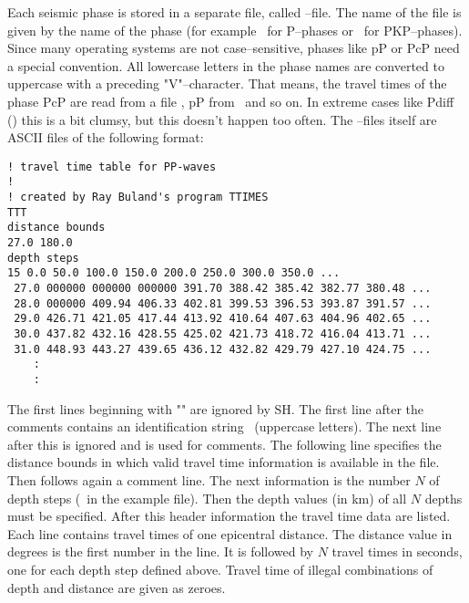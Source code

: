 Each seismic phase is stored in a separate file, called
--file.  The name of the file is given by the name
of the phase (for example \ for P--phases or
\ for PKP--phases).  Since many operating systems are
not case--sensitive, phases like pP or PcP need a special
convention.  All lowercase letters in the phase names are converted
to uppercase with a preceding "V"--character.  That means,
the travel times of the phase PcP are read from a file
, pP from \ and so on.  In extreme
cases like Pdiff () this is a bit clumsy, but
this doesn't happen too often.  The --files itself
are ASCII files of the following format:

\begin{verbatim}
! travel time table for PP-waves
! 
! created by Ray Buland's program TTIMES
TTT
distance bounds
27.0 180.0
depth steps
15 0.0 50.0 100.0 150.0 200.0 250.0 300.0 350.0 ...
 27.0 000000 000000 000000 391.70 388.42 385.42 382.77 380.48 ...
 28.0 000000 409.94 406.33 402.81 399.53 396.53 393.87 391.57 ...
 29.0 426.71 421.05 417.44 413.92 410.64 407.63 404.96 402.65 ...
 30.0 437.82 432.16 428.55 425.02 421.73 418.72 416.04 413.71 ...
 31.0 448.93 443.27 439.65 436.12 432.82 429.79 427.10 424.75 ...
    :
    :
\end{verbatim}

The first lines beginning with "\exm{!}" are ignored by SH.  The
first line after the comments contains an identification string
\ (uppercase letters).  The next line after this is
ignored and is used for comments.  The following line specifies
the distance bounds in which valid travel time information is
available in the file.  Then follows again a comment line.  The
next information is the number $N$ of depth steps (\ in the
example file).  Then the depth values (in km) of all $N$ depths must
be specified.  After this header information the travel time data
are listed.  Each line contains travel times of one epicentral
distance.  The distance value in degrees is the first number
in the line.  It is followed by $N$ travel times in seconds, one
for each depth step defined above.  Travel time of illegal
combinations of depth and distance are given as zeroes.

